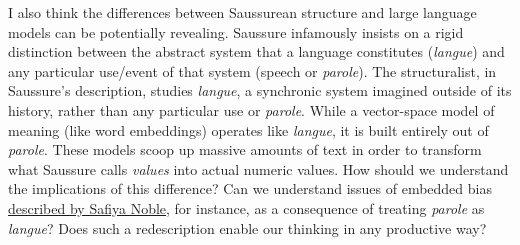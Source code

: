 \documentclass[
  12pt,
]{article}
\begin{document}
I also think the differences between Saussurean structure and large
language models can be potentially revealing. Saussure infamously
insists on a rigid distinction between the abstract system that a
language constitutes (\emph{langue}) and any particular use/event of
that system (speech or \emph{parole}). The structuralist, in Saussure's
description, studies \emph{langue}, a synchronic system imagined outside
of its history, rather than any particular use or \emph{parole}. While a
vector-space model of meaning (like word embeddings) operates like
\emph{langue}, it is built entirely out of \emph{parole}. These models
scoop up massive amounts of text in order to transform what Saussure
calls \emph{values} into actual numeric values. How should we understand
the implications of this difference? Can we understand issues of
embedded bias
\href{https://nyupress.org/9781479837243/algorithms-of-oppression/}{described
by Safiya Noble}, for instance, as a consequence of treating
\emph{parole} as \emph{langue}? Does such a redescription enable our
thinking in any productive way?
\end{document}
